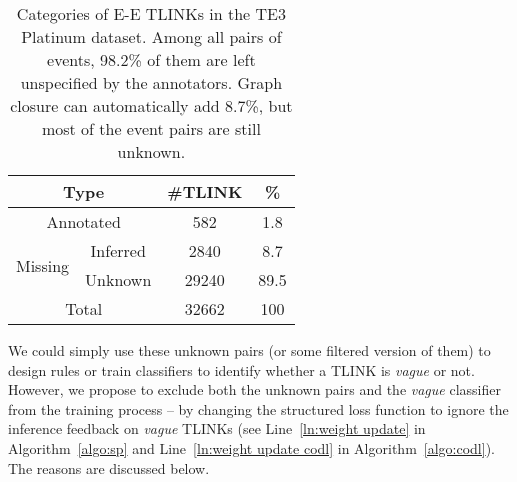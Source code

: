 \documentclass[11pt,letterpaper]{article}
\newcommand{\final}[1]{#1}
\begin{document}
\begin{table}[htbp!]
	\centering
	\caption{\small Categories of E-E TLINKs in the TE3 Platinum dataset. Among all pairs of events, 98.2\% of them are left unspecified by the annotators. Graph closure can automatically \final{add} 8.7\%, but most of the event pairs are still {unknown}.}
	\label{tab: unspecified}
	\begin{tabular}{ c|c|c|c } 
		\hline
		\multicolumn{2}{c|}{Type} & \#TLINK & \%\\
		\hline
		\multicolumn{2}{c|}{Annotated} & 582 & 1.8\\
		\hline
		\multirow{2}{*}{Missing}& Inferred & 2840 & 8.7\\ & Unknown & 29240 & 89.5\\ \hline
		\multicolumn{2}{c|}{Total} & 32662 & 100\\
		\hline
	\end{tabular}
\end{table}

We could simply use these unknown pairs (or some filtered version of them) to design rules or train classifiers to identify whether a TLINK is {\em vague} or not.
However, we propose to exclude both the unknown pairs and the {\em vague} classifier from the training process -- by changing the structured loss function to ignore the inference feedback on {\em vague} TLINKs (see Line~\ref{ln:weight update} in Algorithm~\ref{algo:sp} and Line~\ref{ln:weight update codl} in Algorithm~\ref{algo:codl}). The reasons are \final{discussed below}.
\end{document}
